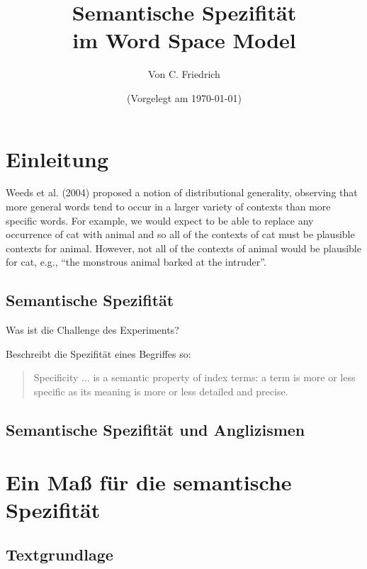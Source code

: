 \documentclass[11pt,numbers=noenddot]{scrartcl}
\title{Semantische Spezifität \\im Word Space Model}
\author{Von C. Friedrich}
\date{(Vorgelegt am \today)}
\begin{document}
\begin{titlepage}
\maketitle



\thispagestyle{empty}
\end{titlepage}



\tableofcontents
\newpage

\section{Einleitung}

Weeds et al. (2004) proposed a notion of distributional generality, observing that more general words tend to occur in a larger variety of contexts than more specific words. For example, we would expect to be able to replace any occurrence of cat with animal and so all of the contexts of cat must be plausible
contexts for animal. However, not all of the contexts of animal would be plausible for cat, e.g., “the monstrous animal barked at the intruder”.

\subsection*{Semantische Spezifität}

Was ist die Challenge des Experiments?

\citet[11]{sparckjones1972} Beschreibt die Spezifität eines Begriffes so:
\begin{quote}
  Specificity ... is a semantic property of index terms: a term is more or less specific as its meaning is more or less detailed and precise.
\end{quote}

\subsection*{Semantische Spezifität und Anglizismen}

\section{Ein Maß für die semantische Spezifität}

\subsection{Textgrundlage}
\end{document}
